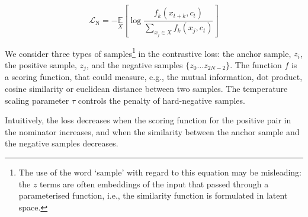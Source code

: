 \begin{equation}
    \mathcal{L}_{\mathrm{N}}=-\underset{X}{\mathbb{E}}\left[\log \frac{f_{k}\left(x_{t+k}, c_{t}\right)}{\sum_{x_{j} \in X} f_{k}\left(x_{j}, c_{t}\right)}\right]
    \label{eq:infonce_loss}
\end{equation}

We consider three types of samples\footnote{The use of the word `sample' with regard to this equation may be misleading: the $z$ terms are often embeddings of the input that passed through a parameterised function, i.e., the similarity function is formulated in latent space.} in the contrastive loss: the anchor sample, $z_i$, the positive sample, $z_j$, and the negative samples $\{ z_0 \dots z_{2N-2} \}$.
The function $f$ is a scoring function, that could measure, e.g., the mutual information, dot product, cosine similarity or euclidean distance between two samples.
The temperature scaling parameter $\tau$ controls the penalty of hard-negative samples.

Intuitively, the loss decreases when the scoring function for the positive pair in the nominator increases, and when the similarity between the anchor sample and the negative samples decreases.








